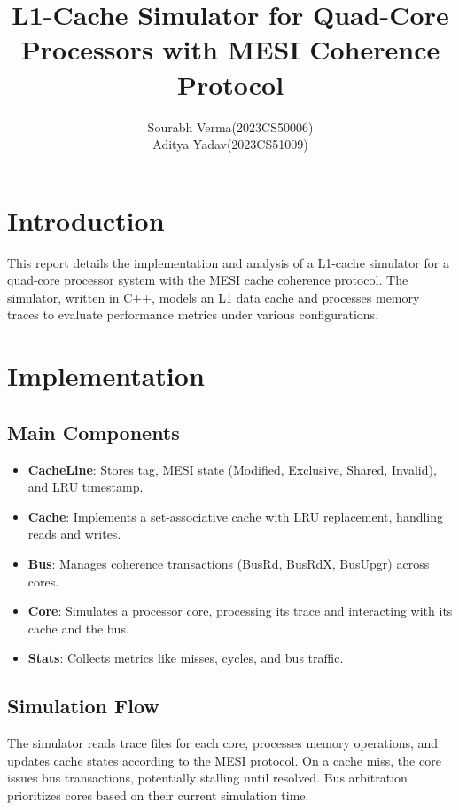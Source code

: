 \documentclass{article}
\begin{document}
\title{L1-Cache Simulator for Quad-Core Processors with MESI Coherence Protocol}
\author{Sourabh Verma(2023CS50006)  \\ Aditya Yadav(2023CS51009)}

\maketitle

\section{Introduction}

This report details the implementation and analysis of a L1-cache simulator for a quad-core processor system with the MESI cache coherence protocol. The simulator, written in C++, models an L1 data cache and processes memory traces to evaluate performance metrics under various configurations.

\section{Implementation}

\subsection{Main Components}

\begin{itemize}
    \item \textbf{CacheLine}: Stores tag, MESI state (Modified, Exclusive, Shared, Invalid), and LRU timestamp.
    \item \textbf{Cache}: Implements a set-associative cache with LRU replacement, handling reads and writes.
    \item \textbf{Bus}: Manages coherence transactions (BusRd, BusRdX, BusUpgr) across cores.
    \item \textbf{Core}: Simulates a processor core, processing its trace and interacting with its cache and the bus.
    \item \textbf{Stats}: Collects metrics like misses, cycles, and bus traffic.
\end{itemize}

\subsection{Simulation Flow}

The simulator reads trace files for each core, processes memory operations, and updates cache states according to the MESI protocol. On a cache miss, the core issues bus transactions, potentially stalling until resolved. Bus arbitration prioritizes cores based on their current simulation time.
\end{document}
